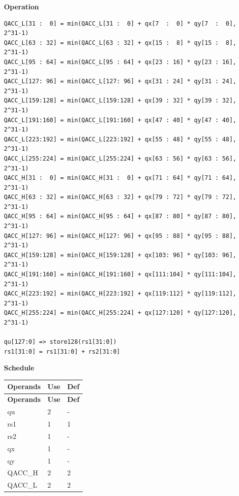 \textbf{Operation}\\

\begin{lstlisting}
QACC_L[31 :  0] = min(QACC_L[31 :  0] + qx[7  :  0] * qy[7  :  0], 2^31-1)
QACC_L[63 : 32] = min(QACC_L[63 : 32] + qx[15 :  8] * qy[15 :  8], 2^31-1)
QACC_L[95 : 64] = min(QACC_L[95 : 64] + qx[23 : 16] * qy[23 : 16], 2^31-1)
QACC_L[127: 96] = min(QACC_L[127: 96] + qx[31 : 24] * qy[31 : 24], 2^31-1)
QACC_L[159:128] = min(QACC_L[159:128] + qx[39 : 32] * qy[39 : 32], 2^31-1)
QACC_L[191:160] = min(QACC_L[191:160] + qx[47 : 40] * qy[47 : 40], 2^31-1)
QACC_L[223:192] = min(QACC_L[223:192] + qx[55 : 48] * qy[55 : 48], 2^31-1)
QACC_L[255:224] = min(QACC_L[255:224] + qx[63 : 56] * qy[63 : 56], 2^31-1)
QACC_H[31 :  0] = min(QACC_H[31 :  0] + qx[71 : 64] * qy[71 : 64], 2^31-1)
QACC_H[63 : 32] = min(QACC_H[63 : 32] + qx[79 : 72] * qy[79 : 72], 2^31-1)
QACC_H[95 : 64] = min(QACC_H[95 : 64] + qx[87 : 80] * qy[87 : 80], 2^31-1)
QACC_H[127: 96] = min(QACC_H[127: 96] + qx[95 : 88] * qy[95 : 88], 2^31-1)
QACC_H[159:128] = min(QACC_H[159:128] + qx[103: 96] * qy[103: 96], 2^31-1)
QACC_H[191:160] = min(QACC_H[191:160] + qx[111:104] * qy[111:104], 2^31-1)
QACC_H[223:192] = min(QACC_H[223:192] + qx[119:112] * qy[119:112], 2^31-1)
QACC_H[255:224] = min(QACC_H[255:224] + qx[127:120] * qy[127:120], 2^31-1)

qu[127:0] => store128(rs1[31:0])
rs1[31:0] = rs1[31:0] + rs2[31:0]
\end{lstlisting}

\textbf{Schedule}\\
\begin{longtable}[c]{|l|l|l|}
    \hline
    \rowcolor{lightgray}
    \textbf{Operands} & \textbf{Use} & \textbf{Def} \\\hline
    \endfirsthead
    \hline
    \rowcolor{lightgray}
     \textbf{Operands} & \textbf{Use} & \textbf{Def} \\\hline
    \endhead
    \hline
    \endfoot

    qu & 2 & - \\\hline
    rs1 & 1 & 1 \\\hline
    rs2 & 1 & - \\\hline
     qx & 1 & - \\\hline
     qy & 1 & - \\\hline
     QACC\_H & 2 & 2 \\\hline
     QACC\_L & 2 & 2

\end{longtable}

